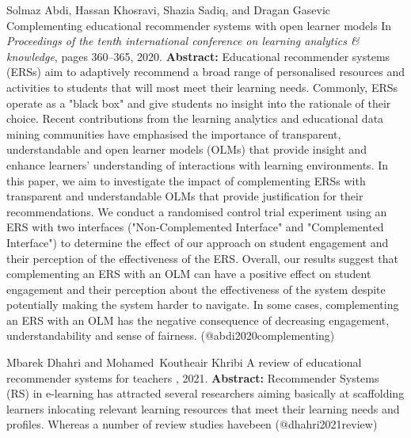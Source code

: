 \documentclass{article}
\begin{document}
\begin{thebibliography}{}
 Solmaz Abdi, Hassan Khosravi, Shazia Sadiq, and Dragan Gasevic \newblock Complementing educational recommender systems with open learner models \newblock In {\em Proceedings of the tenth international conference on learning analytics \& knowledge}, pages 360--365, 2020. \newblock \textbf{Abstract:} Educational recommender systems (ERSs) aim to adaptively recommend a broad range of personalised resources and activities to students that will most meet their learning needs. Commonly, ERSs operate as a "black box" and give students no insight into the rationale of their choice. Recent contributions from the learning analytics and educational data mining communities have emphasised the importance of transparent, understandable and open learner models (OLMs) that provide insight and enhance learners' understanding of interactions with learning environments. In this paper, we aim to investigate the impact of complementing ERSs with transparent and understandable OLMs that provide justification for their recommendations. We conduct a randomised control trial experiment using an ERS with two interfaces ("Non-Complemented Interface" and "Complemented Interface") to determine the effect of our approach on student engagement and their perception of the effectiveness of the ERS. Overall, our results suggest that complementing an ERS with an OLM can have a positive effect on student engagement and their perception about the effectiveness of the system despite potentially making the system harder to navigate. In some cases, complementing an ERS with an OLM has the negative consequence of decreasing engagement, understandability and sense of fairness. \newblock (@abdi2020complementing)

 Mbarek Dhahri and Mohamed~Koutheair Khribi \newblock A review of educational recommender systems for teachers , 2021. \newblock \textbf{Abstract:} Recommender Systems (RS) in e-learning has attracted several researchers aiming basically at scaffolding learners inlocating relevant learning resources that meet their learning needs and profiles. Whereas a number of review studies havebeen \newblock (@dhahri2021review)


\end{thebibliography}
\end{document}
